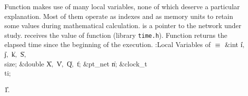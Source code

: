 Function  makes use of many local variables, none of which
deserve a
particular explanation. Most of them operate as indexes and as memory units to
retain some values during mathematical calculation.  is a pointer to
the
network under study.  receives the value of function  (library
{\tt time.h}). Function  returns the elapsed time since the
beginning
of the execution.
\Y\B\4:Local Variables of \X${}\equiv{}$\6
\&{int} \|i${},{}$ \|j${},{}$ \|k${},{}$ \|S${},{}$ \\{size};\6
\&{double} \|X${},{}$ \|V${},{}$ \|Q${},{}$ \|t;\6
\&{pt\_net} \|n;\6
\&{clock\_t} \\{ti};\par
\U1.\fi

